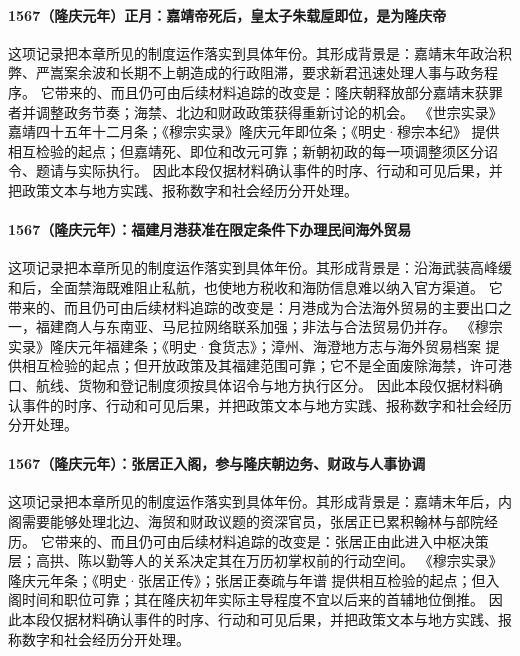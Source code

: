 \paragraph{1567（隆庆元年）正月：嘉靖帝死后，皇太子朱载垕即位，是为隆庆帝} 这项记录把本章所见的制度运作落实到具体年份。其形成背景是：嘉靖末年政治积弊、严嵩案余波和长期不上朝造成的行政阻滞，要求新君迅速处理人事与政务程序。 它带来的、而且仍可由后续材料追踪的改变是：隆庆朝释放部分嘉靖末获罪者并调整政务节奏；海禁、北边和财政政策获得重新讨论的机会。 《世宗实录》嘉靖四十五年十二月条；《穆宗实录》隆庆元年即位条；《明史·穆宗本纪》 提供相互检验的起点；但嘉靖死、即位和改元可靠；新朝初政的每一项调整须区分诏令、题请与实际执行。 因此本段仅据材料确认事件的时序、行动和可见后果，并把政策文本与地方实践、报称数字和社会经历分开处理。

\paragraph{1567（隆庆元年）：福建月港获准在限定条件下办理民间海外贸易} 这项记录把本章所见的制度运作落实到具体年份。其形成背景是：沿海武装高峰缓和后，全面禁海既难阻止私航，也使地方税收和海防信息难以纳入官方渠道。 它带来的、而且仍可由后续材料追踪的改变是：月港成为合法海外贸易的主要出口之一，福建商人与东南亚、马尼拉网络联系加强；非法与合法贸易仍并存。 《穆宗实录》隆庆元年福建条；《明史·食货志》；漳州、海澄地方志与海外贸易档案 提供相互检验的起点；但开放政策及其福建范围可靠；它不是全面废除海禁，许可港口、航线、货物和登记制度须按具体诏令与地方执行区分。 因此本段仅据材料确认事件的时序、行动和可见后果，并把政策文本与地方实践、报称数字和社会经历分开处理。

\paragraph{1567（隆庆元年）：张居正入阁，参与隆庆朝边务、财政与人事协调} 这项记录把本章所见的制度运作落实到具体年份。其形成背景是：嘉靖末年后，内阁需要能够处理北边、海贸和财政议题的资深官员，张居正已累积翰林与部院经历。 它带来的、而且仍可由后续材料追踪的改变是：张居正由此进入中枢决策层；高拱、陈以勤等人的关系决定其在万历初掌权前的行动空间。 《穆宗实录》隆庆元年条；《明史·张居正传》；张居正奏疏与年谱 提供相互检验的起点；但入阁时间和职位可靠；其在隆庆初年实际主导程度不宜以后来的首辅地位倒推。 因此本段仅据材料确认事件的时序、行动和可见后果，并把政策文本与地方实践、报称数字和社会经历分开处理。

